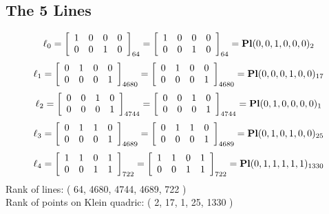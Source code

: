 \documentclass{article}
\begin{document}
{\subsection*{The 5 Lines}
$$
\ell_{0} = 
\left[
\begin{array}{*{4}{r}}
1 & 0 & 0 & 0\\
0 & 0 & 1 & 0\\
\end{array}
\right]
_{64}
=
\left[
\begin{array}{*{4}c}
1  & 0  & 0  & 0\\
0  & 0  & 1  & 0\\
\end{array}
\right]_{64}
={\rm\bf Pl}(0,0,1,0,0,0 )_{2}$$
$$
\ell_{1} = 
\left[
\begin{array}{*{4}{r}}
0 & 1 & 0 & 0\\
0 & 0 & 0 & 1\\
\end{array}
\right]
_{4680}
=
\left[
\begin{array}{*{4}c}
0  & 1  & 0  & 0\\
0  & 0  & 0  & 1\\
\end{array}
\right]_{4680}
={\rm\bf Pl}(0,0,0,1,0,0 )_{17}$$
$$
\ell_{2} = 
\left[
\begin{array}{*{4}{r}}
0 & 0 & 1 & 0\\
0 & 0 & 0 & 1\\
\end{array}
\right]
_{4744}
=
\left[
\begin{array}{*{4}c}
0  & 0  & 1  & 0\\
0  & 0  & 0  & 1\\
\end{array}
\right]_{4744}
={\rm\bf Pl}(0,1,0,0,0,0 )_{1}$$
$$
\ell_{3} = 
\left[
\begin{array}{*{4}{r}}
0 & 1 & 1 & 0\\
0 & 0 & 0 & 1\\
\end{array}
\right]
_{4689}
=
\left[
\begin{array}{*{4}c}
0  & 1  & 1  & 0\\
0  & 0  & 0  & 1\\
\end{array}
\right]_{4689}
={\rm\bf Pl}(0,1,0,1,0,0 )_{25}$$
$$
\ell_{4} = 
\left[
\begin{array}{*{4}{r}}
1 & 1 & 0 & 1\\
0 & 0 & 1 & 1\\
\end{array}
\right]
_{722}
=
\left[
\begin{array}{*{4}c}
1  & 1  & 0  & 1\\
0  & 0  & 1  & 1\\
\end{array}
\right]_{722}
={\rm\bf Pl}(0,1,1,1,1,1 )_{1330}$$
Rank of lines: ( 64, 4680, 4744, 4689, 722 )\\
Rank of points on Klein quadric: ( 2, 17, 1, 25, 1330 )\\
}
\end{document}
